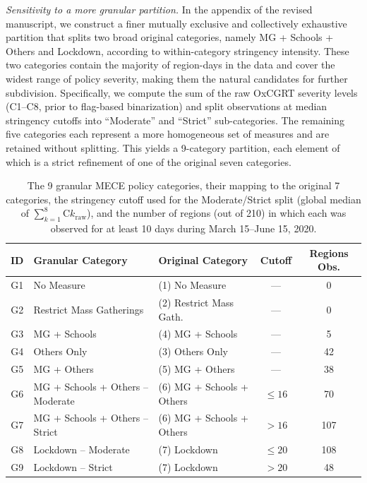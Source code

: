 \documentclass[letterpaper,twoside,11pt]{reviewresponse}
\begin{document}
\textit{Sensitivity to a more granular partition.}  
In the appendix of the revised manuscript, we construct a finer mutually exclusive and collectively exhaustive partition that splits two broad original categories, namely MG + Schools + Others and Lockdown, according to within-category stringency intensity. These two categories contain the majority of region-days in the data and cover the widest range of policy severity, making them the natural candidates for further subdivision. Specifically, we compute the sum of the raw OxCGRT severity levels (C1--C8, prior to flag-based binarization) and split observations at median stringency cutoffs into ``Moderate'' and ``Strict'' sub-categories. The remaining five categories each represent a more homogeneous set of measures and are retained without splitting. This yields a 9-category partition, each element of which is a strict refinement of one of the original seven categories.

\begin{table}[h!]
	\centering
	\small
	\begin{tabular}{|c|l|l|c|c|}
		\hline
		\textbf{ID} & \textbf{Granular Category} & \textbf{Original Category} & \textbf{Cutoff} & \textbf{Regions Obs.} \\\hline
		G1 & No Measure & (1) No Measure & --- & 0 \\
		G2 & Restrict Mass Gatherings & (2) Restrict Mass Gath. & --- & 0 \\
		G3 & MG + Schools & (4) MG + Schools & --- & 5 \\
		G4 & Others Only & (3) Others Only & --- & 42 \\
		G5 & MG + Others & (5) MG + Others & --- & 38 \\
		G6 & MG + Schools + Others -- Moderate & (6) MG + Schools + Others & $\leq 16$ & 70 \\
		G7 & MG + Schools + Others -- Strict & (6) MG + Schools + Others & $> 16$ & 107 \\
		G8 & Lockdown -- Moderate & (7) Lockdown & $\leq 20$ & 108 \\
		G9 & Lockdown -- Strict & (7) Lockdown & $> 20$ & 48 \\\hline
	\end{tabular}
	\caption{The 9 granular MECE policy categories, their mapping to the original 7 categories, the stringency cutoff used for the Moderate/Strict split (global median of $\sum_{k=1}^{8} \text{C}k_{\text{raw}}$), and the number of regions (out of 210) in which each was observed for at least 10 days during March 15--June 15, 2020.}
	\label{tab:granular_policies}
\end{table}
\end{document}
